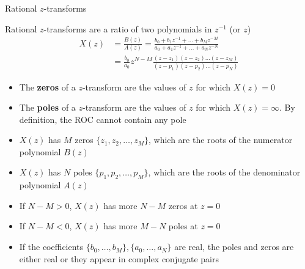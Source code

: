 \documentclass[10pt]{beamer}
\begin{document}
%
\begin{frame}{Rational $z$-transforms}
	
Rational $z$-transforms are a ratio of two polynomials in $z^{-1}$ (or $z$)
\begin{align*}
	X(z) &= \frac{B(z)}{A(z)} = \frac{b_0 + b_1z^{-1}+\ldots+b_Mz^{-M}}{a_0 + a_1z^{-1}+\ldots+a_Nz^{-N}} \\
	&= \frac{b_0}{a_0}z^{N-M}\frac{(z-z_1)(z-z_2)\ldots(z-z_M)}{(z-p_1)(z-p_2)\ldots(z-p_N)}
\end{align*}
\begin{itemize}
	\pause\item The \textbf{zeros} of a $z$-transform are the values of $z$ for which $X(z) = 0$
	\pause\item The \textbf{poles} of a $z$-transform are the values of $z$ for which $X(z) = \infty$. By definition, the ROC cannot contain any pole
	\pause\item $X(z)$ has $M$ zeros $\{z_1, z_2, \ldots, z_M\}$, which are the roots of the numerator polynomial $B(z)$
	\pause\item $X(z)$ has $N$ poles $\{p_1, p_2, \ldots, p_M\}$, which are the roots of the denominator polynomial $A(z)$
	\pause\item If $N-M > 0$, $X(z)$ has more $N-M$ zeros at $z = 0$
	\pause\item If $N-M < 0$, $X(z)$ has more $M-N$ poles at $z = 0$
	\pause\item If the coefficients $\{b_0, \ldots, b_M\}, \{a_0, \ldots, a_N\}$ are real, the poles and zeros are either real or they appear in complex conjugate pairs
\end{itemize}	
\end{frame}
\end{document}
